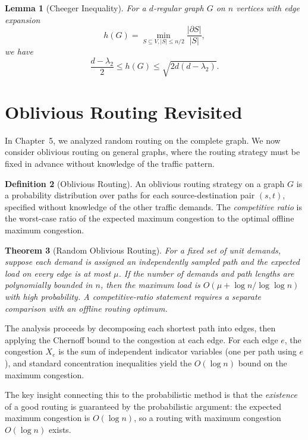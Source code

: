 \documentclass[twoside,12pt]{book}
\theoremstyle{plain}
\newtheorem{theorem}{Theorem}[chapter]
\newtheorem{lemma}[theorem]{Lemma}
\theoremstyle{definition}
\newtheorem{definition}[theorem]{Definition}
\theoremstyle{remark}
\begin{document}
\begin{lemma}[Cheeger Inequality]
\label{lem:cheeger}
For a $d$-regular graph $G$ on $n$ vertices with edge expansion
\[
h(G) = \min_{S \subseteq V, |S| \leq n/2} \frac{|\partial S|}{|S|},
\]
we have
\[
\frac{d - \lambda_2}{2} \leq h(G) \leq \sqrt{2d(d - \lambda_2)}.
\]
\end{lemma}

\section{Oblivious Routing Revisited}
\label{sec:oblivious-routing}

In Chapter~5, we analyzed random routing on the complete graph. We now
consider oblivious routing on general graphs, where the routing strategy
must be fixed in advance without knowledge of the traffic pattern.

\begin{definition}[Oblivious Routing]
An oblivious routing strategy on a graph $G$ is a probability distribution
over paths for each source-destination pair $(s, t)$, specified without
knowledge of the other traffic demands. The \emph{competitive ratio} is
the worst-case ratio of the expected maximum congestion to the optimal
offline maximum congestion.
\end{definition}

\begin{theorem}[Random Oblivious Routing]
\label{thm:oblivious-routing}
For a fixed set of unit demands, suppose each demand is assigned an
independently sampled path and the expected load on every edge is at most
$\mu$.  If the number of demands and path lengths are polynomially bounded
in $n$, then the maximum load is
$O(\mu+\log n/\log\log n)$ with high probability.  A competitive-ratio
statement requires a separate comparison with an offline routing optimum.
\end{theorem}

The analysis proceeds by decomposing each shortest path into edges, then
applying the Chernoff bound to the congestion at each edge. For each edge
$e$, the congestion $X_e$ is the sum of independent indicator variables
(one per path using $e$), and standard concentration inequalities yield
the $O(\log n)$ bound on the maximum congestion.

The key insight connecting this to the probabilistic method is that the
\emph{existence} of a good routing is guaranteed by the probabilistic
argument: the expected maximum congestion is $O(\log n)$, so a routing
with maximum congestion $O(\log n)$ exists.
\end{document}

